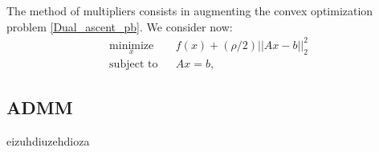\documentclass{article}
\begin{document}
	The method of multipliers consists in augmenting the convex optimization problem \ref{Dual_ascent_pb}. We consider now:
\begin{eqnarray}
\label{M_M_pb}
\underset{x}{\text{minimize}} & & f(x) +(\rho/2)||Ax - b||_2^2 \\
\text{subject to} & & Ax = b, \nonumber
\end{eqnarray}

\subsection{ADMM}
	\label{ADMM}
	
	eizuhdiuzehdioza

 
 

\clearpage
\end{document}
